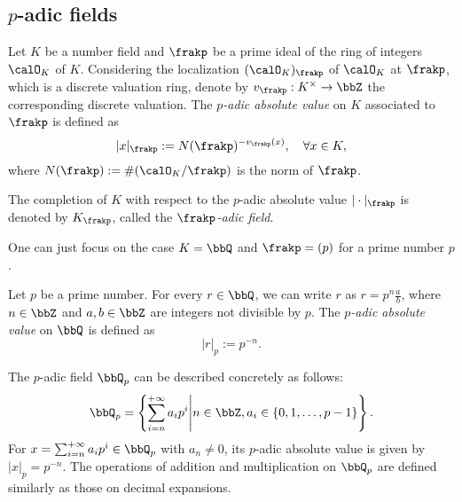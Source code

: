 


\subsection[p-adic fields]{\(p\)-adic fields}

    
    \begin{construction}\label{constr:p-adic_absolute_value_on_number_field}
        Let \(K\) be a number field and \(\frakp\) be a prime ideal of the ring of integers \(\calO_K\) of \(K\).
        Considering the localization \((\calO_K)_\frakp\) of \(\calO_K\) at \(\frakp\), which is a discrete valuation ring, denote by \(v_\frakp: K^\times \to \bbZ\) the corresponding discrete valuation.
        The \emph{\(p\)-adic absolute value} on \(K\) associated to \(\frakp\) is defined as
        \[ |x|_\frakp := N(\frakp)^{-v_\frakp(x)},\quad\forall x \in K, \]
        where \(N(\frakp) := \#(\calO_K / \frakp)\) is the norm of \(\frakp\).

        The completion of \(K\) with respect to the \(p\)-adic absolute value \(|\cdot|_\frakp\) is denoted by \(K_\frakp\), called the \emph{\(\frakp\)-adic field}.
    \end{construction}

    One can just focus on the case \(K = \bbQ\) and \(\frakp = (p)\) for a prime number \(p\).

    \begin{example}\label{eg:p-adic_field}
        Let \(p\) be a prime number. 
        For every \(r \in \bbQ\), we can write \(r\) as \(r = p^n \frac{a}{b}\), where \(n \in \bbZ\) and \(a,b \in \bbZ\) are integers not divisible by \(p\).
        The \emph{\(p\)-adic absolute value} on \(\bbQ\) is defined as
        \[ |r|_p := p^{-n}. \]
      
        The \(p\)-adic field \(\bbQ_p\) can be described concretely as follows:
        \[ \bbQ_p = \left\{ \sum_{i = n}^{+\infty} a_i p^i \middle| n \in \bbZ, a_i \in \{0, 1, \ldots, p-1\} \right\}. \]
        For \(x = \sum_{i = n}^{+\infty} a_i p^i \in \bbQ_p\) with \(a_n \neq 0\), its \(p\)-adic absolute value is given by \(|x|_p = p^{-n}\).
        The operations of addition and multiplication on \(\bbQ_p\) are defined similarly as those on decimal expansions.
    \end{example}

